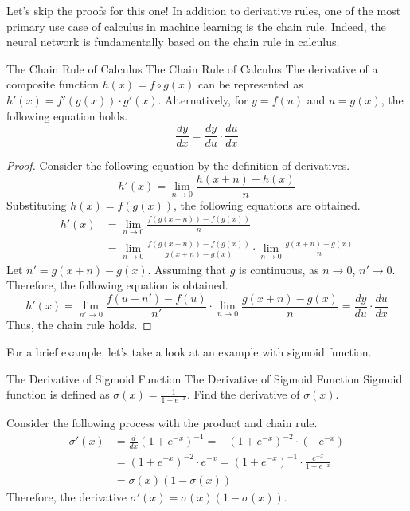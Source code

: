 \documentclass[../../main.tex]{subfiles}
\begin{document}
Let's skip the proofs for this one! In addition to derivative rules,
one of the most primary use case of calculus in machine learning is
the chain rule. Indeed, the neural network is fundamentally based on
the chain rule in calculus.

\begin{theorem}
{The Chain Rule of Calculus}
{The Chain Rule of Calculus}
The derivative of a composite function $h(x) = f \circ g (x)$ can be
represented as $h'(x) = f'(g(x)) \cdot g'(x)$. Alternatively,
for $y = f(u)$ and $u = g(x)$, the following equation holds.
\[
\frac{dy}{dx} = \frac{dy}{du} \cdot \frac{du}{dx}
\]
\end{theorem}
\begin{proof}
Consider the following equation by the definition of derivatives.
\[
h'(x)
= \lim_{n \to 0} \frac{h(x + n) - h(x)}{n}
\]
Substituting $h(x) = f(g(x))$, the following equations are obtained.
\begin{align*}
h'(x)
&= \lim_{n \to 0} \frac{f(g(x + n)) - f(g(x))}{n} \\
&= \lim_{n \to 0} \frac{f(g(x + n)) - f(g(x))}{g(x + n) - g(x)} \cdot
    \lim_{n \to 0} \frac{g(x + n) - g(x)}{n}
\end{align*}
Let $n' = g(x + n) - g(x)$. Assuming that $g$ is continuous,
as $n \to 0$, $n' \to 0$. Therefore, the following equation is
obtained.
\[
h'(x)
= \lim_{n' \to 0} \frac{f(u + n') - f(u)}{n'} \cdot
    \lim_{n \to 0} \frac{g(x + n) - g(x)}{n}
= \frac{dy}{du} \cdot \frac{du}{dx}
\]
Thus, the chain rule holds.
\end{proof}

For a brief example, let's take a look at an example with sigmoid
function.

\begin{problem}
{The Derivative of Sigmoid Function}
{The Derivative of Sigmoid Function}
Sigmoid function is defined as $\sigma(x) = \frac{1}{1 + e^{-x}}$.
Find the derivative of $\sigma(x)$.
\end{problem}
\begin{solution}
Consider the following process with the product and chain rule.
\begin{align*}
    \sigma'(x)
    &= \frac{d}{dx} \left( 1 + e^{-x} \right)^{-1}
    = - \left( 1 + e^{-x} \right)^{-2} \cdot \left( -e^{-x} \right) \\
    &= \left( 1 + e^{-x} \right)^{-2} \cdot e^{-x}
    = \left( 1 + e^{-x} \right)^{-1} \cdot
        \frac{e^{-x}}{1 + e^{-x}} \\
    &= \sigma(x) \left( 1 - \sigma(x) \right)
\end{align*}
Therefore, the derivative $\sigma'(x) = \sigma(x) (1 - \sigma(x))$.
\end{solution}
\end{document}
